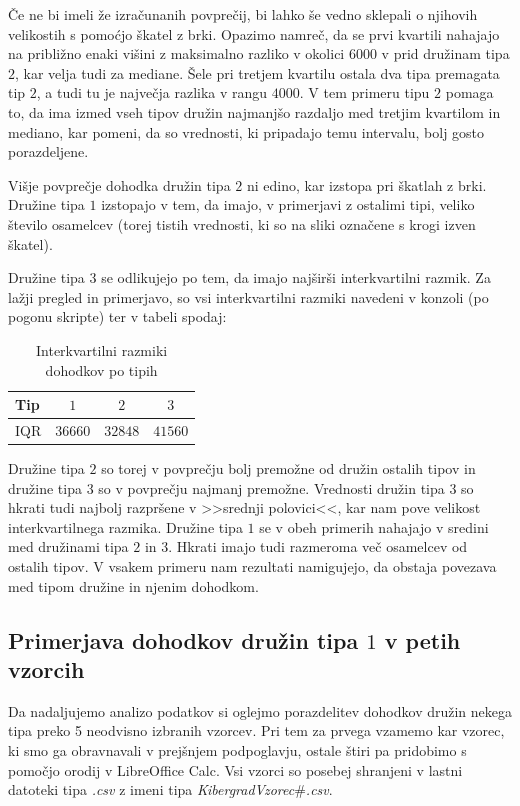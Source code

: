\documentclass[a4paper, 10pt]{article}
\begin{document}
	Če ne bi imeli že izračunanih povprečij, bi lahko še vedno sklepali o njihovih velikostih s pomoćjo škatel z brki. Opazimo namreč, da se prvi kvartili nahajajo na približno enaki višini z maksimalno razliko v okolici $6000$ v prid družinam tipa $2$, kar velja tudi za mediane. Šele pri tretjem kvartilu ostala dva tipa premagata tip $2$, a tudi tu je največja razlika v rangu $4000$. V tem primeru tipu $2$ pomaga to, da ima izmed vseh tipov družin najmanjšo razdaljo med tretjim kvartilom in mediano, kar pomeni, da so vrednosti, ki pripadajo temu intervalu, bolj gosto porazdeljene.

	Višje povprečje dohodka družin tipa $2$ ni edino, kar izstopa pri škatlah z brki. Družine tipa $1$ izstopajo v tem, da imajo, v primerjavi z ostalimi tipi, veliko število osamelcev (torej tistih vrednosti, ki so na sliki označene s krogi izven škatel).

	Družine tipa $3$ se odlikujejo po tem, da imajo najširši interkvartilni razmik. Za lažji pregled in primerjavo, so vsi interkvartilni razmiki navedeni v konzoli (po pogonu skripte) ter v tabeli spodaj:
	\begin{table}[h!]
		\centering
		\begin{tabular}{|l|c|c|c|}
			\hline
			Tip & $1$ & $2$ & $3$ \\ \hline
			IQR & $36660$ & $32848$ & $41560$ \\ \hline
		\end{tabular}
		\caption{Interkvartilni razmiki dohodkov po tipih}
	\end{table}

	Družine tipa $2$ so torej v povprečju bolj premožne od družin ostalih tipov in družine tipa $3$ so v povprečju najmanj premožne. Vrednosti družin tipa $3$ so hkrati tudi najbolj razpršene v >>srednji polovici<<, kar nam pove velikost interkvartilnega razmika. Družine tipa $1$ se v obeh primerih nahajajo v sredini med družinami tipa $2$ in $3$. Hkrati imajo tudi razmeroma več osamelcev od ostalih tipov. V vsakem primeru nam rezultati namigujejo, da obstaja povezava med tipom družine in njenim dohodkom.
	\newpage
	\subsection{Primerjava dohodkov družin tipa $1$ v petih vzorcih}
	Da nadaljujemo analizo podatkov si oglejmo porazdelitev dohodkov družin nekega tipa preko 5 neodvisno izbranih vzorcev. Pri tem za prvega vzamemo kar vzorec, ki smo ga obravnavali v prejšnjem podpoglavju, ostale štiri pa pridobimo s pomočjo orodij v LibreOffice Calc. Vsi vzorci so posebej shranjeni v lastni datoteki tipa \textit{.csv} z imeni tipa \textit{KibergradVzorec$\#$.csv}.
\end{document}

